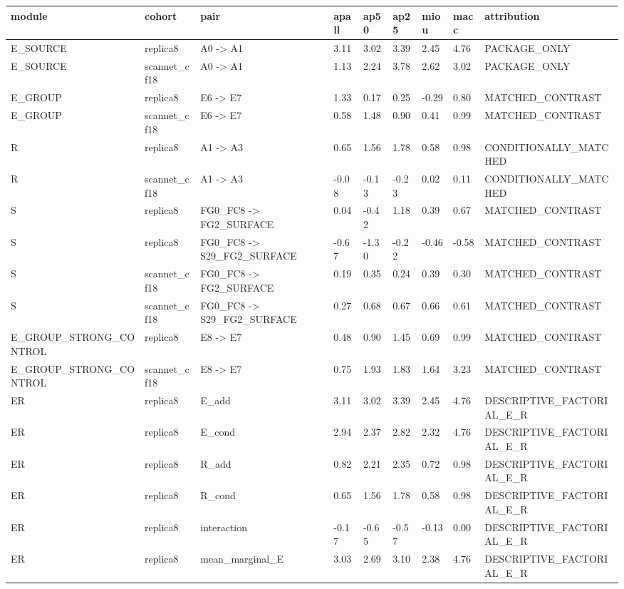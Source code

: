\begin{tabular}{lllllllll}
\toprule
module & cohort & pair & apall & ap50 & ap25 & miou & macc & attribution \\
\midrule
E\_SOURCE & replica8 & A0 -> A1 & 3.11 & 3.02 & 3.39 & 2.45 & 4.76 & PACKAGE\_ONLY \\
E\_SOURCE & scannet\_cf18 & A0 -> A1 & 1.13 & 2.24 & 3.78 & 2.62 & 3.02 & PACKAGE\_ONLY \\
E\_GROUP & replica8 & E6 -> E7 & 1.33 & 0.17 & 0.25 & -0.29 & 0.80 & MATCHED\_CONTRAST \\
E\_GROUP & scannet\_cf18 & E6 -> E7 & 0.58 & 1.48 & 0.90 & 0.41 & 0.99 & MATCHED\_CONTRAST \\
R & replica8 & A1 -> A3 & 0.65 & 1.56 & 1.78 & 0.58 & 0.98 & CONDITIONALLY\_MATCHED \\
R & scannet\_cf18 & A1 -> A3 & -0.08 & -0.13 & -0.23 & 0.02 & 0.11 & CONDITIONALLY\_MATCHED \\
S & replica8 & FG0\_FC8 -> FG2\_SURFACE & 0.04 & -0.42 & 1.18 & 0.39 & 0.67 & MATCHED\_CONTRAST \\
S & replica8 & FG0\_FC8 -> S29\_FG2\_SURFACE & -0.67 & -1.30 & -0.22 & -0.46 & -0.58 & MATCHED\_CONTRAST \\
S & scannet\_cf18 & FG0\_FC8 -> FG2\_SURFACE & 0.19 & 0.35 & 0.24 & 0.39 & 0.30 & MATCHED\_CONTRAST \\
S & scannet\_cf18 & FG0\_FC8 -> S29\_FG2\_SURFACE & 0.27 & 0.68 & 0.67 & 0.66 & 0.61 & MATCHED\_CONTRAST \\
E\_GROUP\_STRONG\_CONTROL & replica8 & E8 -> E7 & 0.48 & 0.90 & 1.45 & 0.69 & 0.99 & MATCHED\_CONTRAST \\
E\_GROUP\_STRONG\_CONTROL & scannet\_cf18 & E8 -> E7 & 0.75 & 1.93 & 1.83 & 1.64 & 3.23 & MATCHED\_CONTRAST \\
ER & replica8 & E\_add & 3.11 & 3.02 & 3.39 & 2.45 & 4.76 & DESCRIPTIVE\_FACTORIAL\_E\_R \\
ER & replica8 & E\_cond & 2.94 & 2.37 & 2.82 & 2.32 & 4.76 & DESCRIPTIVE\_FACTORIAL\_E\_R \\
ER & replica8 & R\_add & 0.82 & 2.21 & 2.35 & 0.72 & 0.98 & DESCRIPTIVE\_FACTORIAL\_E\_R \\
ER & replica8 & R\_cond & 0.65 & 1.56 & 1.78 & 0.58 & 0.98 & DESCRIPTIVE\_FACTORIAL\_E\_R \\
ER & replica8 & interaction & -0.17 & -0.65 & -0.57 & -0.13 & 0.00 & DESCRIPTIVE\_FACTORIAL\_E\_R \\
ER & replica8 & mean\_marginal\_E & 3.03 & 2.69 & 3.10 & 2.38 & 4.76 & DESCRIPTIVE\_FACTORIAL\_E\_R \\

\end{tabular}

